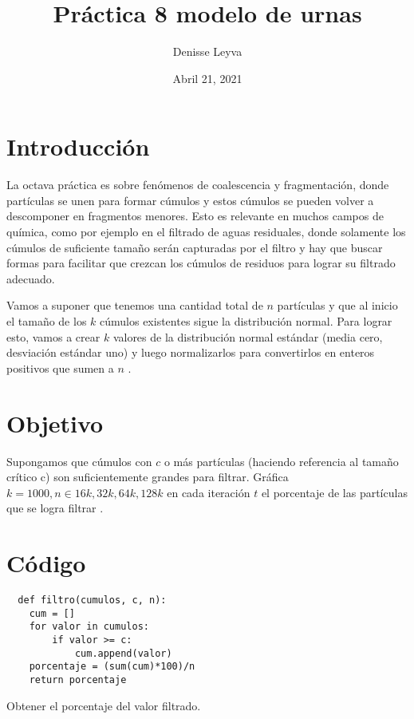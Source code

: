 \documentclass{article}
\title{Práctica 8 modelo de urnas}
\author{Denisse Leyva}
\date{Abril 21, 2021}
\begin{document}
\maketitle


\section{Introducción}
La octava práctica es sobre fenómenos de coalescencia y fragmentación, donde partículas se unen para formar cúmulos y estos cúmulos se pueden volver a descomponer en fragmentos menores. Esto es relevante en muchos campos de química, como por ejemplo en el filtrado de aguas residuales, donde solamente los cúmulos de suficiente tamaño serán capturadas por el filtro y hay que buscar formas para facilitar que crezcan los cúmulos de residuos para lograr su filtrado adecuado.

Vamos a suponer que tenemos una cantidad total de $n$ partículas y que al inicio el tamaño de los $k$ cúmulos existentes sigue la distribución normal. Para lograr esto, vamos a crear $k$ valores de la distribución normal estándar (media cero, desviación estándar uno) y luego normalizarlos para convertirlos en enteros positivos que sumen a $n$ \cite{Satu_Elisa_Schaeffer}.

\section{Objetivo}
Supongamos que cúmulos con $c$ o más partículas (haciendo referencia al tamaño crítico c) son suficientemente grandes para filtrar. Gráfica $k=1000, n \in {16k,32k, 64k, 128k}$ en cada iteración $t$ el porcentaje de las partículas que se logra filtrar \cite{Satu_Elisa_Schaeffer}.

\section{Código}
\renewcommand{\listingscaption}{Código}
\begin{listing}[H]
  \begin{verbatim}
  def filtro(cumulos, c, n):
    cum = []
    for valor in cumulos:
        if valor >= c:
            cum.append(valor)
    porcentaje = (sum(cum)*100)/n
    return porcentaje
      \end{verbatim}
  \label{lst:fibo}
  \caption{Obtener el porcentaje del valor filtrado.}
\end{listing}
\end{document}
